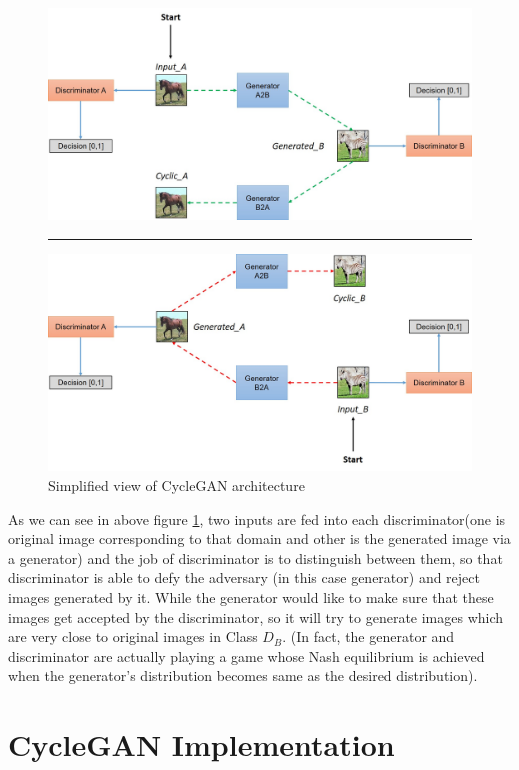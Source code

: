 \documentclass[peerreview]{IEEEtran}
\begin{document}
\begin{figure}[H]
    \centering
    \includegraphics[width=0.8\columnwidth]{simplified_cyclegan_1.jpg}
    \par\noindent\rule{0.8\columnwidth}{0.4pt}
    \includegraphics[width=0.8\columnwidth]{simplified_cyclegan_2.jpg}
    \caption{Simplified view of CycleGAN architecture }
    \label{fig:s=simple_cyclegan_arc}
\end{figure}

As we can see in above figure \ref{fig:s=simple_cyclegan_arc}, two inputs are fed into each discriminator(one is original image corresponding to that domain and other is the generated image via a generator) and the job of discriminator is to distinguish between them, so that discriminator is able to defy the adversary (in this case generator) and reject images generated by it. While the generator would like to make sure that these images get accepted by the discriminator, so it will try to generate images which are very close to original images in Class $D_B$. (In fact, the generator and discriminator are actually playing a game whose Nash equilibrium is achieved when the generator's distribution becomes same as the desired distribution).

\section{CycleGAN Implementation}
\end{document}
